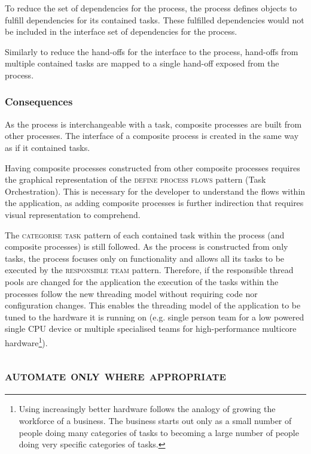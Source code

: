 \documentclass[prodmode]{style/acmlarge}
\begin{document}
To reduce the set of dependencies for the process, the process defines objects
to fulfill dependencies for its contained tasks.  These fulfilled dependencies
would not be included in the interface set of dependencies for the process.

Similarly to reduce the hand-offs for the interface to the process, hand-offs
from multiple contained tasks are mapped to a single hand-off exposed from the
process.

\subsubsection*{Consequences} As the process is interchangeable with a task,
composite processes are built from other processes.  The interface of a
composite process is created in the same way as if it contained tasks.

Having composite processes constructed from other composite processes requires
the graphical representation of the \textsc{define process flows} pattern (Task
Orchestration).  This is necessary for the developer to understand the flows
within the application, as adding composite processes is further indirection
that requires visual representation to comprehend.

The \textsc{categorise task} pattern of each contained task within the process
(and composite processes) is still followed.  As the process is constructed from
only tasks, the process focuses only on functionality and allows all its tasks
to be executed by the \textsc{responsible team} pattern.  Therefore, if the
responsible thread pools are changed for the application the execution of the
tasks within the processes follow the new threading model without requiring code
nor configuration changes.  This enables the threading model of the application
to be tuned to the hardware it is running on (e.g. single person team for a low
powered single CPU device or multiple specialised teams for high-performance
multicore hardware\footnote{Using increasingly better hardware follows the
analogy of growing the workforce of a business.  The business starts out only as
a small number of people doing many categories of tasks to becoming a large
number of people doing very specific categories of tasks.}).



\subsection{\textsc{\textbf{automate only where appropriate}}}
\end{document}
